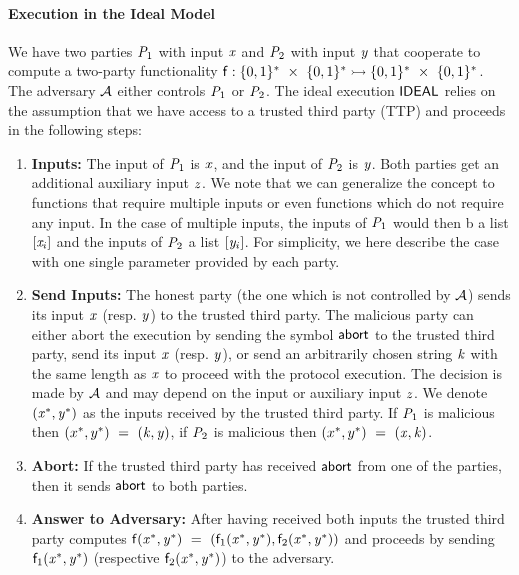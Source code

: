 \paragraph{Execution in the Ideal Model} We have two parties $\mathit{P}_{1}$ with input $\mathit{x}$ and $\mathit{P}_{2}$ with input $\mathit{y}$ that cooperate to compute a two-party functionality $\mathsf{f} : \{0,1\}^{*} ~\times~ \{0,1\}^{*} \rightarrowtail \{0,1\}^{*} ~\times~ \{0,1\}^{*}$.
The adversary $\mathcal{A}$ either controls $\mathit{P}_{1}$ or $\mathit{P}_{2}$.
The ideal execution $\mathsf{IDEAL}$ relies on the assumption that we have access to a trusted third party (TTP) and proceeds in the following steps:

\begin{enumerate}
    \item \textbf{Inputs:} The input of $\mathit{P}_{1}$ is $\mathit{x}$, and the input of $\mathit{P}_{2}$ is $\mathit{y}$.
    Both parties get an additional auxiliary input $\mathit{z}$.
    We note that we can generalize the concept to functions that require multiple inputs or even functions which do not require any input.
    In the case of multiple inputs, the inputs of $\mathit{P}_{1}$ would then b a list $[\mathit{x}_i]$ and the inputs of $\mathit{P}_{2}$ a list $[\mathit{y}_i]$.
    For simplicity, we here describe the case with one single parameter provided by each party.
    \item \textbf{Send Inputs:} The honest party (the one which is not controlled by $\mathcal{A}$) sends its input $\mathit{x}$ (resp. $\mathit{y}$) to the trusted third party.
    The malicious party can either abort the execution by sending the symbol $\mathsf{abort}$ to the trusted third party, send its input $\mathit{x}$ (resp. $\mathit{y}$), or send an arbitrarily chosen string $\mathit{k}$ with the same length as $\mathit{x}$ to proceed with the protocol execution.
    The decision is made by $\mathcal{A}$ and may depend on the input or auxiliary input $\mathit{z}$.
    We denote $(\mathit{x}^*, \mathit{y}^*)$ as the inputs received by the trusted third party.
    If $\mathit{P}_{1}$ is malicious then $(x^*, y^*) ~=~ (\mathit{k}, \mathit{y})$, if $\mathit{P}_{2}$ is malicious then $(x^*, y^*) ~=~ (\mathit{x}, \mathit{k})$.
    \item \textbf{Abort:} If the trusted third party has received $\mathsf{abort}$ from one of the parties, then it sends $\mathsf{abort}$ to both parties.
    \item \textbf{Answer to Adversary:} After having received both inputs the trusted third party computes $\mathsf{f}(\mathit{x}^*, \mathit{y}^*) ~=~ (\mathsf{f}_1(\mathit{x}^*, \mathit{y}^*), \mathsf{f}_2(\mathit{x}^*, \mathit{y}^*))$ and proceeds by sending $\mathsf{f}_1(\mathit{x}^*, \mathit{y}^*)$ (respective $\mathsf{f}_2(\mathit{x}^*, \mathit{y}^*)$) to the adversary.

\end{enumerate}
